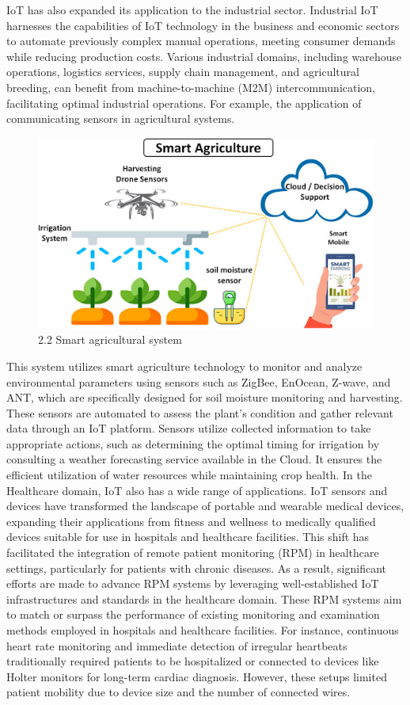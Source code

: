 IoT has also expanded its application to the industrial sector. Industrial IoT harnesses the capabilities of IoT technology in the business and economic sectors to automate previously complex manual operations, meeting consumer demands while reducing production costs. Various industrial domains, including warehouse operations, logistics services, supply chain management, and agricultural breeding, can benefit from machine-to-machine (M2M) intercommunication, facilitating optimal industrial operations. For example, the application of communicating sensors in agricultural systems. 

\begin{center}
    \begin{figure}[!htp]
        \centering
        \includegraphics[width=0.8 \textwidth]{image/smart_argi.png}
        \caption{2.2 Smart agricultural system}
        \label{subsection}
    \end{figure}
    \end{center}
This system utilizes smart agriculture technology to monitor and analyze environmental parameters using sensors such as ZigBee, EnOcean, Z-wave, and ANT, which are specifically designed for soil moisture monitoring and harvesting. These sensors are automated to assess the plant's condition and gather relevant data through an IoT platform. Sensors utilize collected information to take appropriate actions, such as determining the optimal timing for irrigation by consulting a weather forecasting service available in the Cloud. It ensures the efficient utilization of water resources while maintaining crop health.
In the Healthcare domain, IoT also has a wide range of applications. IoT sensors and devices have transformed the landscape of portable and wearable medical devices, expanding their applications from fitness and wellness to medically qualified devices suitable for use in hospitals and healthcare facilities. This shift has facilitated the integration of remote patient monitoring (RPM) in healthcare settings, particularly for patients with chronic diseases. As a result, significant efforts are made to advance RPM systems by leveraging well-established IoT infrastructures and standards in the healthcare domain. These RPM systems aim to match or surpass the performance of existing monitoring and examination methods employed in hospitals and healthcare facilities.  For instance, continuous heart rate monitoring and immediate detection of irregular heartbeats traditionally required patients to be hospitalized or connected to devices like Holter monitors for long-term cardiac diagnosis. 
However, these setups limited patient mobility due to device size and the number of connected wires.

